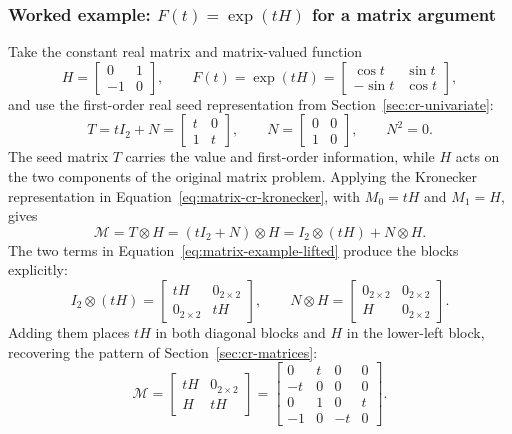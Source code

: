 \documentclass[10pt]{article}
\begin{document}
\subsubsection{Worked example: \texorpdfstring{$F(t)=\exp(tH)$}{F(t) = exp(tH)} for a matrix argument}
\label{sec:example-cr-matrix}
Take the constant real matrix and matrix-valued function
\[
 H=\begin{bmatrix}0&1\\-1&0\end{bmatrix},\qquad
 F(t)=\exp(tH)=\begin{bmatrix}\cos t&\sin t\\-\sin t&\cos t\end{bmatrix},
\]
and use the first-order real seed representation from
Section~\ref{sec:cr-univariate}:
\begin{equation}
\label{eq:matrix-example-seeded}
 T=tI_2+N=\begin{bmatrix}t&0\\1&t\end{bmatrix},\qquad
 N=\begin{bmatrix}0&0\\1&0\end{bmatrix},\qquad N^2=0.
\end{equation}
The seed matrix $T$ carries the value and first-order information, while $H$
acts on the two components of the original matrix problem. Applying the
Kronecker representation in Equation~\eqref{eq:matrix-cr-kronecker}, with
$M_0=tH$ and $M_1=H$, gives
\begin{equation}
\label{eq:matrix-example-lifted}
 \mathcal M=T\otimes H
 =(tI_2+N)\otimes H
 =I_2\otimes(tH)+N\otimes H.
\end{equation}
The two terms in Equation~\eqref{eq:matrix-example-lifted} produce the blocks
explicitly:
\[
 I_2\otimes(tH)=\begin{bmatrix}tH&0_{2\times2}\\0_{2\times2}&tH\end{bmatrix},
 \qquad
 N\otimes H=\begin{bmatrix}0_{2\times2}&0_{2\times2}\\H&0_{2\times2}\end{bmatrix}.
\]
Adding them places $tH$ in both diagonal blocks and $H$ in the lower-left
block, recovering the pattern of Section~\ref{sec:cr-matrices}:
\[
 \mathcal M=\begin{bmatrix}tH&0_{2\times2}\\H&tH\end{bmatrix}
 =\left[\begin{array}{cc|cc}
   0&t&0&0\\
   -t&0&0&0\\\hline
   0&1&0&t\\
   -1&0&-t&0
  \end{array}\right].
\]
\end{document}
